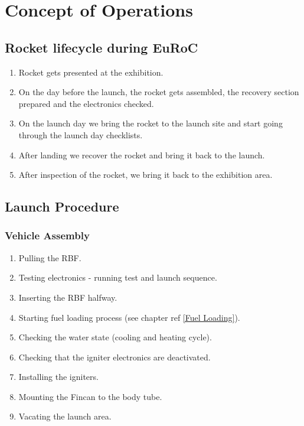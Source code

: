 \chapter{Concept of Operations}
\label{chap:conops}

\section{Rocket lifecycle during EuRoC}
\begin{enumerate}
    \item Rocket gets presented at the exhibition.
    \item On the day before the launch, the rocket gets assembled, the recovery section prepared and the electronics checked.
    \item On the launch day we bring the rocket to the launch site and start going through the launch day checklists.
    \item After landing we recover the rocket and bring it back to the launch.
    \item After inspection of the rocket, we bring it back to the exhibition area.
\end{enumerate}

\section{Launch Procedure}

\subsection{Vehicle Assembly}
\begin{enumerate}
\item Pulling the RBF.
\item Testing electronics - running test and launch sequence.
\item Inserting the RBF halfway.
\item Starting fuel loading process (see chapter ref \ref{Fuel Loading}).
\item Checking the water state (cooling and heating cycle).
\item Checking that the igniter electronics are deactivated.
\item Installing the igniters.
\item Mounting the Fincan to the body tube.
\item Vacating the launch area.
\end{enumerate}

